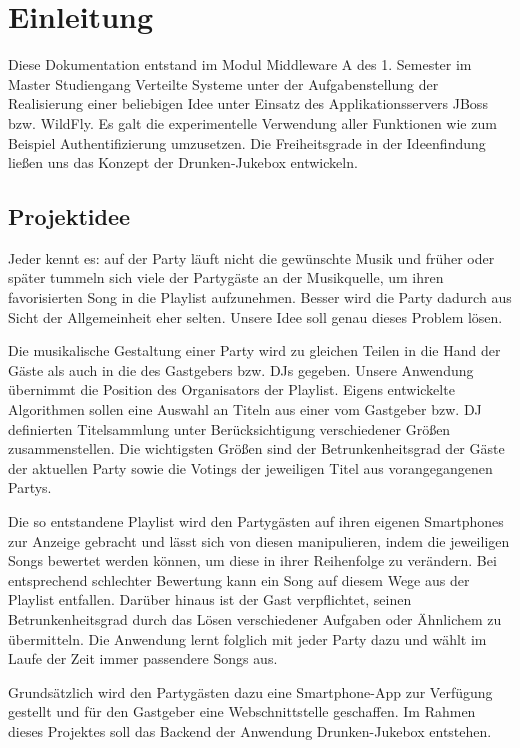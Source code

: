 \section{Einleitung}
Diese Dokumentation entstand im Modul Middleware A des 1. Semester im Master Studiengang Verteilte Systeme unter der Aufgabenstellung der Realisierung einer beliebigen Idee unter Einsatz des Applikationsservers JBoss bzw. WildFly. Es galt die experimentelle Verwendung aller Funktionen wie zum Beispiel Authentifizierung umzusetzen.
Die Freiheitsgrade in der Ideenfindung ließen uns das Konzept der Drunken-Jukebox entwickeln.

\subsection{Projektidee}
Jeder kennt es: auf der Party läuft nicht die gewünschte Musik und früher oder später tummeln sich viele der Partygäste an der Musikquelle, um ihren favorisierten Song in die Playlist aufzunehmen. Besser wird die Party dadurch aus Sicht der Allgemeinheit eher selten. Unsere Idee soll genau dieses Problem lösen.

Die musikalische Gestaltung einer Party wird zu gleichen Teilen in die Hand der Gäste als auch in die des Gastgebers bzw. DJs gegeben. Unsere Anwendung übernimmt die Position des Organisators der Playlist. Eigens entwickelte Algorithmen sollen eine Auswahl an Titeln aus einer vom Gastgeber bzw. DJ definierten Titelsammlung unter Berücksichtigung verschiedener Größen zusammenstellen. Die wichtigsten Größen sind der Betrunkenheitsgrad der Gäste der aktuellen Party sowie die Votings der jeweiligen Titel aus vorangegangenen Partys.

Die so entstandene Playlist wird den Partygästen auf ihren eigenen Smartphones zur Anzeige gebracht und lässt sich von diesen manipulieren, indem die jeweiligen Songs bewertet werden können, um diese in ihrer Reihenfolge zu verändern. Bei entsprechend schlechter Bewertung kann ein Song auf diesem Wege aus der Playlist entfallen. Darüber hinaus ist der Gast verpflichtet, seinen Betrunkenheitsgrad durch das Lösen verschiedener Aufgaben oder Ähnlichem zu übermitteln. Die Anwendung lernt folglich mit jeder Party dazu und wählt im Laufe der Zeit immer passendere Songs aus. 

Grundsätzlich wird den Partygästen dazu eine Smartphone-App zur Verfügung gestellt und für den Gastgeber eine Webschnittstelle geschaffen. Im Rahmen dieses Projektes soll das Backend der Anwendung Drunken-Jukebox entstehen. 